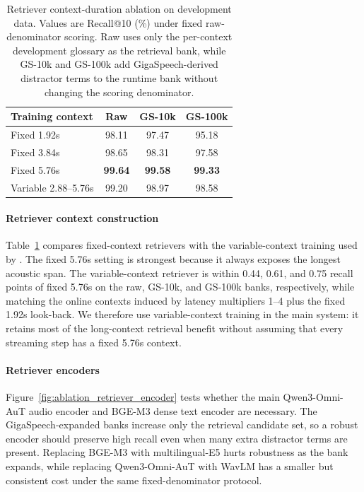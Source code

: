\begin{table}[t]
\centering
\small
\setlength{\tabcolsep}{4pt}
\begin{tabular}{lccc}
\toprule
Training context & Raw & GS-10k & GS-100k \\
\midrule
Fixed 1.92s & 98.11 & 97.47 & 95.18 \\
Fixed 3.84s & 98.65 & 98.31 & 97.58 \\
Fixed 5.76s & \textbf{99.64} & \textbf{99.58} & \textbf{99.33} \\
Variable 2.88--5.76s & 99.20 & 98.97 & 98.58 \\
\bottomrule
\end{tabular}
\caption{Retriever context-duration ablation on development data. Values are Recall@10 (\%) under fixed raw-denominator scoring. Raw uses only the per-context development glossary as the retrieval bank, while GS-10k and GS-100k add GigaSpeech-derived distractor terms to the runtime bank without changing the scoring denominator.}
\label{tab:ablation_context}
\end{table}

\paragraph{Retriever context construction}
Table~\ref{tab:ablation_context} compares fixed-context retrievers with the variable-context training used by \method. The fixed 5.76s setting is strongest because it always exposes the longest acoustic span. The variable-context retriever is within 0.44, 0.61, and 0.75 recall points of fixed 5.76s on the raw, GS-10k, and GS-100k banks, respectively, while matching the online contexts induced by latency multipliers 1--4 plus the fixed 1.92s look-back. We therefore use variable-context training in the main system: it retains most of the long-context retrieval benefit without assuming that every streaming step has a fixed 5.76s context.

\paragraph{Retriever encoders}
Figure~\ref{fig:ablation_retriever_encoder} tests whether the main Qwen3-Omni-AuT audio encoder and BGE-M3 dense text encoder are necessary. The GigaSpeech-expanded banks increase only the retrieval candidate set, so a robust encoder should preserve high recall even when many extra distractor terms are present. Replacing BGE-M3 with multilingual-E5 hurts robustness as the bank expands, while replacing Qwen3-Omni-AuT with WavLM has a smaller but consistent cost under the same fixed-denominator protocol.

